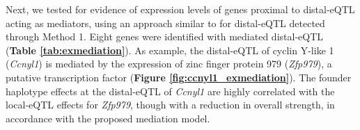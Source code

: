 \documentclass[9pt,twocolumn,twoside]{gsajnl}
\begin{document}

Next, we tested for evidence of expression levels of genes proximal to distal-eQTL acting as mediators, using an approach similar to \cite{Keller2018} for distal-eQTL detected through Method 1. 
Eight genes were identified with mediated distal-eQTL (\textbf{Table \ref{tab:exmediation}}). As example, the distal-eQTL of cyclin Y-like 1 (\textit{Ccnyl1}) is mediated by the expression of zinc finger protein 979 (\textit{Zfp979}), a putative transcription factor (\textbf{Figure \ref{fig:ccnyl1_exmediation}}). The founder haplotype effects at the distal-eQTL of \textit{Ccnyl1} are highly correlated with the local-eQTL effects for \textit{Zfp979}, though with a reduction in overall strength, in accordance with the proposed mediation model.
\end{document}
